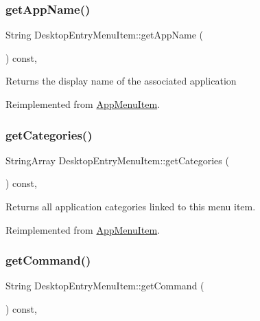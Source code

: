 \subsubsection{\texorpdfstring{get\+App\+Name()}{getAppName()}}
{\footnotesize\ttfamily String Desktop\+Entry\+Menu\+Item\+::get\+App\+Name (\begin{DoxyParamCaption}{ }\end{DoxyParamCaption}) const\hspace{0.3cm}{\ttfamily [override]}, {\ttfamily [virtual]}}

\begin{DoxyReturn}{Returns}
the display name of the associated application 
\end{DoxyReturn}


Reimplemented from \mbox{\hyperlink{classAppMenuItem_aef18401da6511ac234ccbb2d2131fcad}{App\+Menu\+Item}}.

\mbox{\label{classDesktopEntryMenuItem_a1bf16bd033c09fca27c950d45717c862}} 
\subsubsection{\texorpdfstring{get\+Categories()}{getCategories()}}
{\footnotesize\ttfamily String\+Array Desktop\+Entry\+Menu\+Item\+::get\+Categories (\begin{DoxyParamCaption}{ }\end{DoxyParamCaption}) const\hspace{0.3cm}{\ttfamily [override]}, {\ttfamily [virtual]}}

\begin{DoxyReturn}{Returns}
all application categories linked to this menu item. 
\end{DoxyReturn}


Reimplemented from \mbox{\hyperlink{classAppMenuItem_a4d944a13d50b5156d77d0d735c7a0a90}{App\+Menu\+Item}}.

\mbox{\label{classDesktopEntryMenuItem_a544130c3a2984272cd80955dd3c9126d}} 
\subsubsection{\texorpdfstring{get\+Command()}{getCommand()}}
{\footnotesize\ttfamily String Desktop\+Entry\+Menu\+Item\+::get\+Command (\begin{DoxyParamCaption}{ }\end{DoxyParamCaption}) const\hspace{0.3cm}{\ttfamily [override]}, {\ttfamily [virtual]}}

